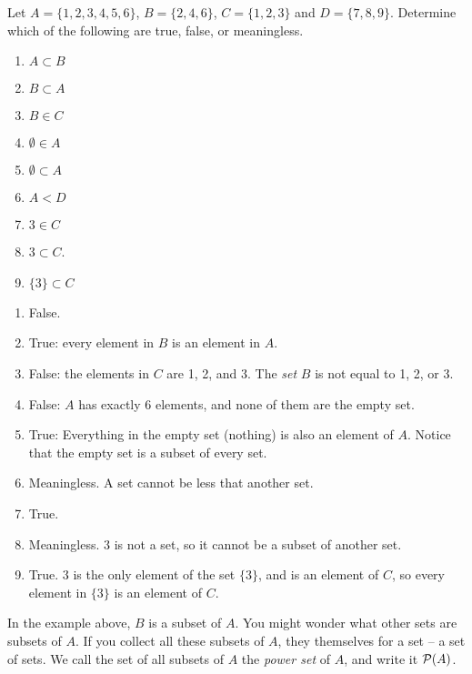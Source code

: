 \documentclass[12pt]{article}
\begin{document}
\begin{example}
 Let $A = \{1, 2, 3, 4, 5, 6\}$, $B = \{2, 4, 6\}$, $C = \{1, 2, 3\}$ and $D = \{7, 8, 9\}$.  Determine which of the following are true, false, or meaningless.
\begin{multicols}{3}
\begin{enumerate}
\item $A \subset B$
\item $B \subset A$
\item $B \in C$
\item $\emptyset \in A$
\item $\emptyset \subset A$
\item $A < D$
\item $3 \in C$
\item $3 \subset C$.
\item $\{3\} \subset C$
\end{enumerate}
\end{multicols}
\begin{solution}
 \begin{enumerate}
  \item False.
\item True: every element in $B$ is an element in $A$.
\item False: the elements in $C$ are 1, 2, and 3.  The \emph{set} $B$ is not equal to 1, 2, or 3.
\item False: $A$ has exactly 6 elements, and none of them are the empty set.
\item True: Everything in the empty set (nothing) is also an element of $A$.  Notice that the empty set is a subset of every set.
\item Meaningless.  A set cannot be less that another set.
\item True.
\item Meaningless.  $3$ is not a set, so it cannot be a subset of another set.
\item True.  $3$ is the only element of the set $\{3\}$, and is an element of $C$, so every element in $\{3\}$ is an element of $C$.
 \end{enumerate}
\end{solution}
\end{example}

In the example above, $B$ is a subset of $A$.  You might wonder what other sets are subsets of $A$.  If you collect all these subsets of $A$, they themselves for a set -- a set of sets.  We call the set of all subsets of $A$ the \emph{power set} of $A$, and write it $\mathcal P(A)$.  
\end{document}

